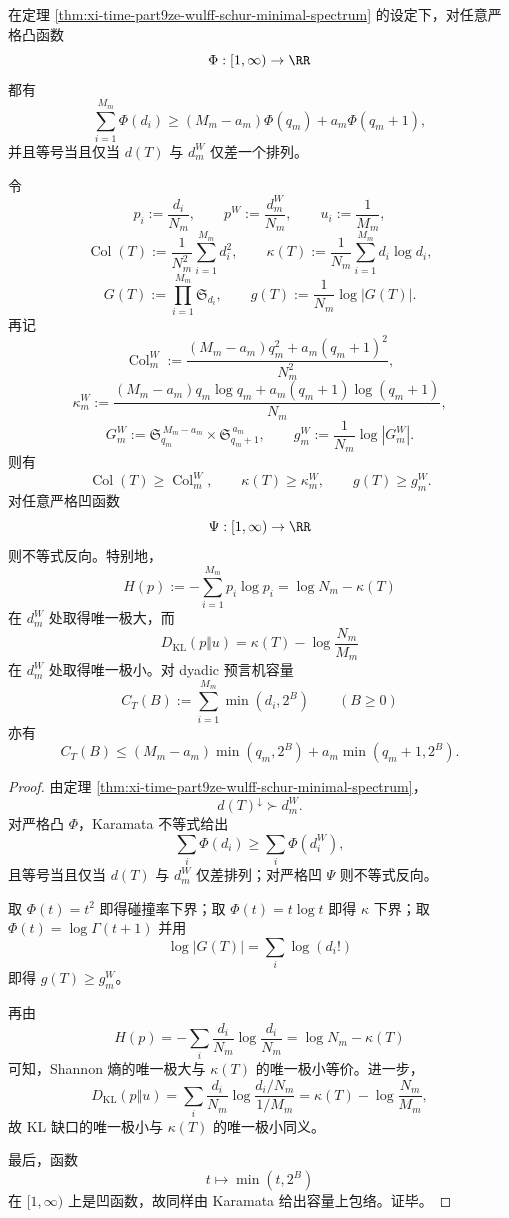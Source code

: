 \begin{corollary}\label{cor:xi-time-part9ze-wulff-schur-convex-envelope}
在定理 \ref{thm:xi-time-part9ze-wulff-schur-minimal-spectrum} 的设定下，对任意严格凸函数
\[
\Phi:[1,\infty)\to \RR
\]
都有
\[
\sum_{i=1}^{M_m}\Phi(d_i)\ge
(M_m-a_m)\Phi(q_m)+a_m\Phi(q_m+1),
\]
并且等号当且仅当 \(d(T)\) 与 \(d_m^W\) 仅差一个排列。

令
\[
p_i:=\frac{d_i}{N_m},
\qquad
p^W:=\frac{d_m^W}{N_m},
\qquad
u_i:=\frac{1}{M_m},
\]
\[
\operatorname{Col}(T):=\frac{1}{N_m^2}\sum_{i=1}^{M_m}d_i^2,
\qquad
\kappa(T):=\frac{1}{N_m}\sum_{i=1}^{M_m}d_i\log d_i,
\]
\[
G(T):=\prod_{i=1}^{M_m}\mathfrak S_{d_i},
\qquad
g(T):=\frac{1}{N_m}\log|G(T)|.
\]
再记
\[
\operatorname{Col}_m^W:=
\frac{(M_m-a_m)q_m^2+a_m(q_m+1)^2}{N_m^2},
\]
\[
\kappa_m^W:=
\frac{(M_m-a_m)q_m\log q_m+a_m(q_m+1)\log(q_m+1)}{N_m},
\]
\[
G_m^W:=\mathfrak S_{q_m}^{\,M_m-a_m}\times \mathfrak S_{q_m+1}^{\,a_m},
\qquad
g_m^W:=\frac{1}{N_m}\log|G_m^W|.
\]
则有
\[
\operatorname{Col}(T)\ge \operatorname{Col}_m^W,
\qquad
\kappa(T)\ge \kappa_m^W,
\qquad
g(T)\ge g_m^W.
\]
对任意严格凹函数
\[
\Psi:[1,\infty)\to \RR
\]
则不等式反向。特别地，
\[
H(p):=-\sum_{i=1}^{M_m}p_i\log p_i
=\log N_m-\kappa(T)
\]
在 \(d_m^W\) 处取得唯一极大，而
\[
D_{\mathrm{KL}}(p\Vert u)
=
\kappa(T)-\log\frac{N_m}{M_m}
\]
在 \(d_m^W\) 处取得唯一极小。对 dyadic 预言机容量
\[
C_T(B):=\sum_{i=1}^{M_m}\min(d_i,2^B)
\qquad (B\ge 0)
\]
亦有
\[
C_T(B)\le
(M_m-a_m)\min(q_m,2^B)+a_m\min(q_m+1,2^B).
\]
\end{corollary}
\begin{proof}
由定理 \ref{thm:xi-time-part9ze-wulff-schur-minimal-spectrum}，
\[
d(T)^\downarrow\succ d_m^W.
\]
对严格凸 \(\Phi\)，Karamata 不等式给出
\[
\sum_i\Phi(d_i)\ge \sum_i\Phi(d_i^W),
\]
且等号当且仅当 \(d(T)\) 与 \(d_m^W\) 仅差排列；对严格凹 \(\Psi\) 则不等式反向。

取 \(\Phi(t)=t^2\) 即得碰撞率下界；取 \(\Phi(t)=t\log t\) 即得 \(\kappa\) 下界；取 \(\Phi(t)=\log\Gamma(t+1)\) 并用
\[
\log|G(T)|=\sum_i\log(d_i!)
\]
即得 \(g(T)\ge g_m^W\)。

再由
\[
H(p)= -\sum_i\frac{d_i}{N_m}\log\frac{d_i}{N_m}
=\log N_m-\kappa(T)
\]
可知，Shannon 熵的唯一极大与 \(\kappa(T)\) 的唯一极小等价。进一步，
\[
D_{\mathrm{KL}}(p\Vert u)
=\sum_i\frac{d_i}{N_m}\log\frac{d_i/N_m}{1/M_m}
=\kappa(T)-\log\frac{N_m}{M_m},
\]
故 KL 缺口的唯一极小与 \(\kappa(T)\) 的唯一极小同义。

最后，函数
\[
t\longmapsto \min(t,2^B)
\]
在 \([1,\infty)\) 上是凹函数，故同样由 Karamata 给出容量上包络。证毕。
\end{proof}

